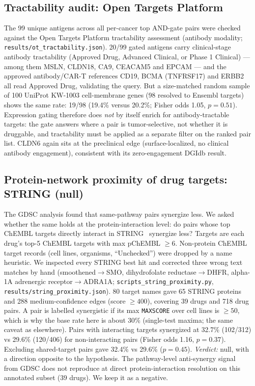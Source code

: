 \documentclass[11pt]{article}
\begin{document}
\subsection{Tractability audit: Open Targets Platform}
The 99 unique antigens across all per-cancer top AND-gate pairs were
checked against the Open Targets Platform tractability assessment
(antibody modality; \texttt{results/ot\_tractability.json}). 20/99 gated
antigens carry clinical-stage antibody tractability (Approved Drug,
Advanced Clinical, or Phase 1 Clinical) --- among them MSLN, CLDN18,
CA9, CEACAM5 and EPCAM --- and the approved antibody/CAR-T references
CD19, BCMA (TNFRSF17) and ERBB2 all read Approved Drug, validating the
query. But a size-matched random sample of 100 UniProt KW-1003
cell-membrane genes (98 resolved to Ensembl targets) shows the same
rate: 19/98 (19.4\% versus 20.2\%; Fisher odds 1.05, $p = 0.51$).
Expression gating therefore does \emph{not} by itself enrich for
antibody-tractable targets: the gate answers where a pair is
tumor-selective, not whether it is druggable, and tractability must be
applied as a separate filter on the ranked pair list. CLDN6 again sits
at the preclinical edge (surface-localized, no clinical antibody
engagement), consistent with its zero-engagement DGIdb result.

\subsection{Protein-network proximity of drug targets: STRING (null)}
The GDSC analysis found that same-pathway pairs synergize less. We asked whether the same holds at the protein-interaction level: do pairs whose top ChEMBL targets directly interact in STRING~\cite{string} synergize less? Targets are each drug's top-5 ChEMBL targets with max pChEMBL $\geq 6$. Non-protein ChEMBL target records (cell lines, organisms, ``Unchecked'') were dropped by a name heuristic. We inspected every STRING best hit and corrected three wrong text matches by hand (smoothened$\to$SMO, dihydrofolate reductase$\to$DHFR, alpha-1A adrenergic receptor$\to$ADRA1A; \texttt{scripts\_string\_proximity.py}, \texttt{results/string\_proximity.json}). 80 target names gave 65 STRING proteins and 288 medium-confidence edges (score $\geq 400$), covering 39 drugs and 718 drug pairs. A pair is labelled synergistic if its max \texttt{MAXSCORE} over cell lines is $\geq 50$, which is why the base rate here is about 30\% (single-test maxima; the same caveat as elsewhere). Pairs with interacting targets synergized at 32.7\% (102/312) vs 29.6\% (120/406) for non-interacting pairs (Fisher odds 1.16, $p=0.37$). Excluding shared-target pairs gave 32.4\% vs 29.6\% ($p=0.45$). \emph{Verdict:} null, with a direction opposite to the hypothesis. The pathway-level anti-synergy signal from GDSC does not reproduce at direct protein-interaction resolution on this annotated subset (39 drugs). We keep it as a negative.
\end{document}
